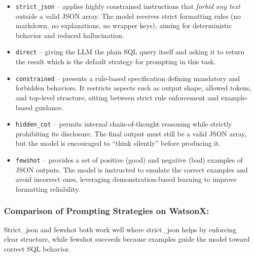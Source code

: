 \documentclass[12pt]{article}
\begin{document}
\begin{itemize}
    \item \verb|strict_json| – applies highly constrained instructions that \emph{forbid any text} outside a valid JSON array.  
    The model receives strict formatting rules (no markdown, no explanations, no wrapper keys), aiming for deterministic behavior and reduced hallucination.  
    

    \item \verb|direct| – giving the LLM the plain SQL query itself and asking it to return the result which is the default strategy for prompting in this task.   
    

    \item \verb|constrained| – presents a rule-based specification defining mandatory and forbidden behaviors.  
    It restricts aspects such as output shape, allowed tokens, and top-level structure, sitting between strict rule enforcement and example-based guidance.  
    

    \item \verb|hidden_cot| – permits internal chain-of-thought reasoning while strictly prohibiting its disclosure.  
    The final output must still be a valid JSON array, but the model is encouraged to “think silently” before producing it.  
   

    \item \verb|fewshot| – provides a set of positive (good) and negative (bad) examples of JSON outputs.  
    The model is instructed to emulate the correct examples and avoid incorrect ones, leveraging demonstration-based learning to improve formatting reliability.   
    
    
\end{itemize}

\subsubsection{Comparison of Prompting Strategies on WatsonX:}
 
Strict\_json and fewshot both work well where strict\_json helps by enforcing clear structure, while fewshot succeeds because examples guide the model toward correct SQL behavior.

\begin{table}[h]
\centering
{}
\caption{strict\_json Prompting with watsonx model}
\end{table}
\end{document}
